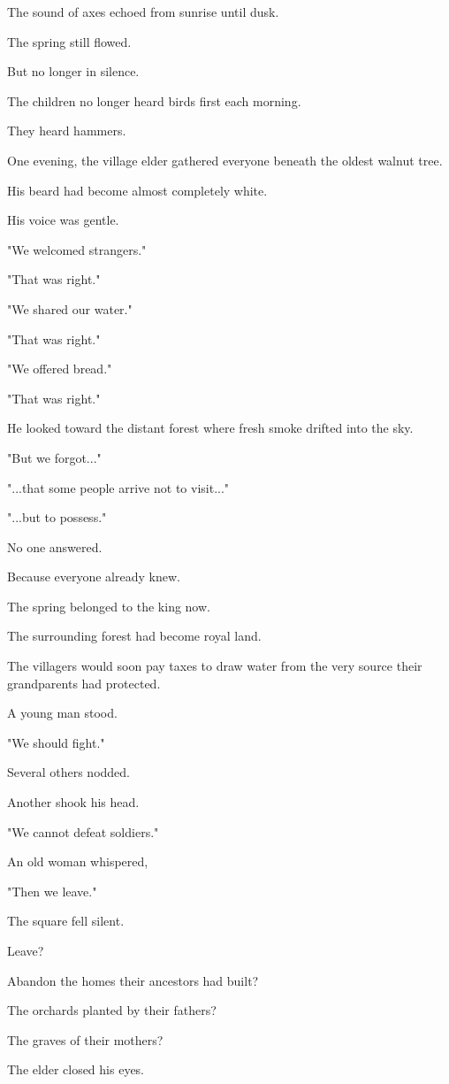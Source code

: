 \documentclass[12pt,openany]{book}
\begin{document}
The sound of axes echoed from sunrise until dusk.

The spring still flowed.

But no longer in silence.

The children no longer heard birds first each morning.

They heard hammers.

One evening, the village elder gathered everyone beneath the oldest walnut tree.

His beard had become almost completely white.

His voice was gentle.

"We welcomed strangers."

"That was right."

"We shared our water."

"That was right."

"We offered bread."

"That was right."

He looked toward the distant forest where fresh smoke drifted into the sky.

"But we forgot..."

"...that some people arrive not to visit..."

"...but to possess."

No one answered.

Because everyone already knew.

The spring belonged to the king now.

The surrounding forest had become royal land.

The villagers would soon pay taxes to draw water from the very source their grandparents had protected.

A young man stood.

"We should fight."

Several others nodded.

Another shook his head.

"We cannot defeat soldiers."

An old woman whispered,

"Then we leave."

The square fell silent.

Leave?

Abandon the homes their ancestors had built?

The orchards planted by their fathers?

The graves of their mothers?

The elder closed his eyes.
\end{document}
